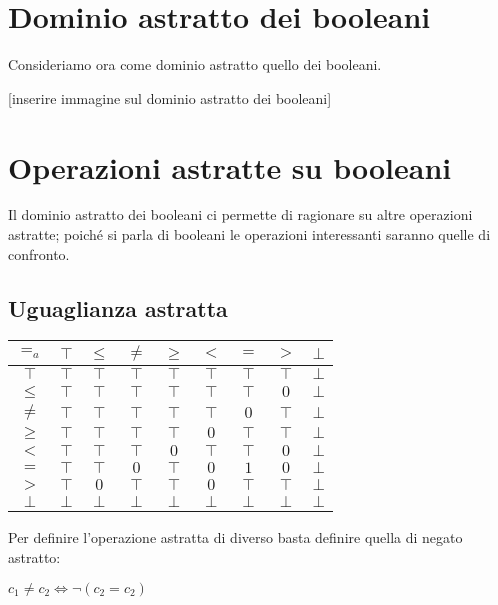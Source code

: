 \documentclass[a4paper, 12pt, oneside,fleqn]{book}
\begin{document}
\section{Dominio astratto dei booleani}

Consideriamo ora come dominio astratto quello dei booleani.

[inserire immagine sul dominio astratto dei booleani]

\section{Operazioni astratte su booleani}

Il dominio astratto dei booleani ci permette di ragionare su altre operazioni astratte; poiché si parla di booleani le operazioni interessanti saranno quelle di confronto. 

\subsection{Uguaglianza astratta}

\begin{center}
	\begin{tabular}{| c | c | c | c | c | c | c | c | c | }
		\hline
		$=_a$ & $\top$ & $\leq$ & $\neq$ & $\geq$ & $<$ & $=$ & $>$ & $\bot$ \\
		\hline
		$\top$ & $\top$ & $\top$ & $\top$ & $\top$ & $\top$ & $\top$ & $\top$ & $\bot$ \\
		\hline
		$\leq$ & $\top$ & $\top$ & $\top$ & $\top$ & $\top$ & $\top$ & $0$ & $\bot$\\
		\hline
		$\neq$ & $\top$ & $\top$ & $\top$ & $\top$ & $\top$ & $0$ & $\top$ & $\bot$\\
		\hline
		$\geq$ & $\top$ & $\top$ & $\top$ & $\top$ & $0$ & $\top$ & $\top$ & $\bot$\\
		\hline
		$<$ & $\top$ & $\top$ & $\top$ & $0$ & $\top$ & $\top$ & $0$ & $\bot$\\
		\hline
		$=$ & $\top$ & $\top$ & $0$ & $\top$ & $0$ & $1$ & $0$ & $\bot$\\
		\hline
		$>$ & $\top$ & $0$ & $\top$ & $\top$ & $0$ & $\top$ & $\top$ & $\bot$\\
		\hline
		$\bot$ & $\bot$ & $\bot$ & $\bot$ & $\bot$ & $\bot$ & $\bot$ & $\bot$ & $\bot$\\
		\hline
	\end{tabular}
\end{center}

Per definire l'operazione astratta di diverso basta definire quella di negato astratto:
\begin{center}
	$ c_1 \neq c_2 \iff \neg (c_2 = c_2) $
\end{center}
\end{document}
